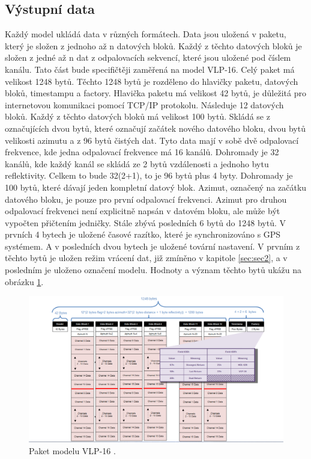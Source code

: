 \documentclass[czech,bachelor,dept420,male,cpdeclaration]{diploma}
\begin{document}
\subsection{Výstupní data}\label{secref:secref1}
Každý model ukládá data v různých formátech. Data jsou uložená v paketu, který je složen z jednoho až n datových bloků. Každý z těchto datových bloků je složen z jedné až n dat z odpalovacích sekvencí, které jsou uložené pod číslem kanálu. Tato část bude specifičtěji zaměřená na model VLP-16. Celý paket má velikost \num{1248} bytů. Těchto \num{1248} bytů je rozděleno do hlavičky paketu, datových bloků, timestampu a factory. Hlavička paketu má velikost \num{42} bytů, je důležitá pro internetovou komunikaci pomocí TCP/IP protokolu. Následuje \num{12} datových bloků. Každý z těchto datových bloků má velikost \num{100} bytů. Skládá se z označujících dvou bytů, které označují začátek nového datového bloku, dvou bytů velikosti azimutu a z \num{96} bytů čistých dat. Tyto data mají v sobě dvě odpalovací frekvence, kde jedna odpalovací frekvence má \num{16} kanálů. Dohromady je \num{32} kanálů, kde každý kanál se skládá ze \num{2} bytů vzdálenosti a jednoho bytu reflektivity. Celkem to bude 32(2+1), to je \num{96} bytů plus \num{4} byty. Dohromady je \num{100} bytů, které dávají jeden kompletní datový blok. Azimut, označený na začátku datového bloku, je pouze pro první odpalovací frekvenci. Azimut pro druhou odpalovací frekvenci není explicitně napsán v datovém bloku, ale může být vypočten přičtením jedničky. Stále zbývá posledních 6 bytů do \num{1248} bytů. V prvních \num{4} bytech je uložené časové razítko, které je synchronizováno s GPS systémem. A v posledních dvou bytech je uložené tovární nastavení. V prvním z těchto bytů je uložen režim vrácení dat, již zmíněno v kapitole \ref{sec:sec2}, a v posledním je uloženo označení modelu. Hodnoty a význam těchto bytů ukážu na obrázku \ref{fig:packet}.

\begin{figure}[H]
\includegraphics[width=\linewidth]{Figures/packet.png}
\caption{ Paket modelu VLP-16 \cite{packet}. }
\label{fig:packet}
\end{figure}
\end{document}
